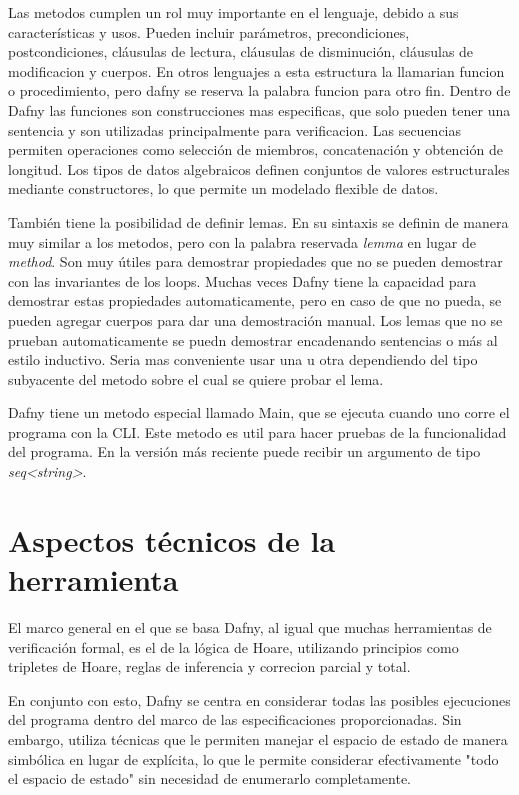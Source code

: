 \documentclass[runningheads]{llncs}
\begin{document}
Las metodos cumplen un rol muy importante en el lenguaje, debido a sus características y usos.
Pueden incluir parámetros, precondiciones, postcondiciones, cláusulas de lectura, cláusulas de disminución, cláusulas de modificacion y cuerpos.
En otros lenguajes a esta estructura la llamarian funcion o procedimiento, pero dafny se reserva la palabra funcion para otro fin.
Dentro de Dafny las funciones son construcciones mas especificas, que solo pueden tener una sentencia y son utilizadas principalmente para verificacion.
Las secuencias permiten operaciones como selección de miembros, concatenación y obtención de longitud.
Los tipos de datos algebraicos definen conjuntos de valores estructurales mediante constructores, lo que permite un modelado flexible de datos.

También tiene la posibilidad de definir lemas. En su sintaxis se definin de manera muy similar a los metodos, pero con la palabra reservada \textit{lemma} en lugar de \textit{method}.
Son muy útiles para demostrar propiedades que no se pueden demostrar con las invariantes de los loops.
Muchas veces Dafny tiene la capacidad para demostrar estas propiedades automaticamente, pero en caso de que no pueda, se pueden agregar cuerpos para dar una demostración manual.
Los lemas que no se prueban automaticamente se puedn demostrar encadenando sentencias o más al estilo inductivo. Seria mas conveniente usar una u otra dependiendo del tipo subyacente del metodo sobre el cual se quiere probar el lema.

Dafny tiene un metodo especial llamado Main, que se ejecuta cuando uno corre el programa con la CLI. Este metodo es util para hacer pruebas de la funcionalidad del programa.
En la versión más reciente puede recibir un argumento de tipo \textit{seq<string>}.

\section{Aspectos técnicos de la herramienta}
El marco general en el que se basa Dafny, al igual que muchas herramientas de verificación formal, es el de la lógica de Hoare,
utilizando principios como tripletes de Hoare, reglas de inferencia y correcion parcial y total.

En conjunto con esto, Dafny se centra en considerar todas las posibles ejecuciones del programa dentro del marco de las especificaciones proporcionadas. 
Sin embargo, utiliza técnicas que le permiten manejar el espacio de estado de manera simbólica en lugar de explícita, 
lo que le permite considerar efectivamente "todo el espacio de estado" sin necesidad de enumerarlo completamente.
\end{document}
